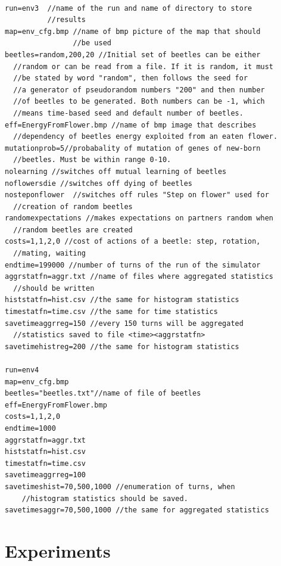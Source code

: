 \documentclass[a4paper,12pt]{report}
\begin{document}
\begin{verbatim} 

run=env3  //name of the run and name of directory to store 
          //results
map=env_cfg.bmp //name of bmp picture of the map that should 
                //be used 
beetles=random,200,20 //Initial set of beetles can be either 
  //random or can be read from a file. If it is random, it must 
  //be stated by word "random", then follows the seed for 
  //a generator of pseudorandom numbers "200" and then number 
  //of beetles to be generated. Both numbers can be -1, which 
  //means time-based seed and default number of beetles.
eff=EnergyFromFlower.bmp //name of bmp image that describes 
  //dependency of beetles energy exploited from an eaten flower.
mutationprob=5//probabality of mutation of genes of new-born
  //beetles. Must be within range 0-10.
nolearning //switches off mutual learning of beetles
noflowersdie //switches off dying of beetles
nosteponflower	//switches off rules "Step on flower" used for 
  //creation of random beetles
randomexpectations //makes expectations on partners random when 
  //random beetles are created
costs=1,1,2,0 //cost of actions of a beetle: step, rotation, 
  //mating, waiting
endtime=199000 //number of turns of the run of the simulator
aggrstatfn=aggr.txt //name of files where aggregated statistics 
  //should be written
histstatfn=hist.csv //the same for histogram statistics
timestatfn=time.csv //the same for time statistics
savetimeaggrreg=150 //every 150 turns will be aggregated 
  //statistics saved to file <time><aggrstatfn>
savetimehistreg=200 //the same for histogram statistics

run=env4
map=env_cfg.bmp
beetles="beetles.txt"//name of file of beetles
eff=EnergyFromFlower.bmp
costs=1,1,2,0
endtime=1000
aggrstatfn=aggr.txt
histstatfn=hist.csv
timestatfn=time.csv
savetimeaggrreg=100
savetimeshist=70,500,1000 //enumeration of turns, when
    //histogram statistics should be saved. 
savetimesaggr=70,500,1000 //the same for aggregated statistics

\end{verbatim}




\chapter{Experiments}
\end{document}
